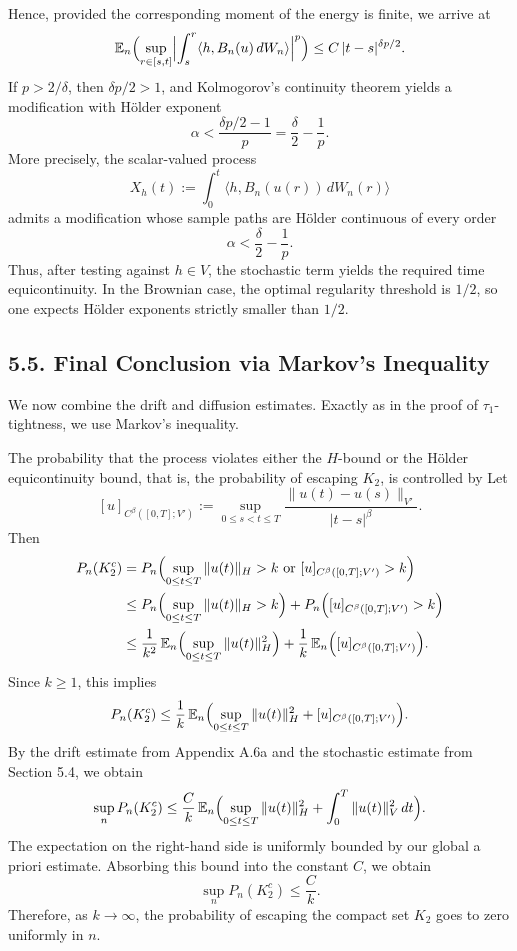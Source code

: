 \documentclass[11pt]{article}
\theoremstyle{definition}
\theoremstyle{remark}
\begin{document}
Hence, provided the corresponding moment of the energy is finite, we arrive at
\[
  \mathbb E_n\Bigl(
    \sup_{r\in[s,t]}
    \Bigl|
      \int_s^r \langle h,B_n(u)\,dW_n\rangle
    \Bigr|^p
  \Bigr)
  \le
  C\,|t-s|^{\delta p/2}.
\]
If $p>2/\delta$, then $\delta p/2>1$, and Kolmogorov's continuity theorem yields a modification with H\"older exponent
\[
  \alpha<\frac{\delta p/2-1}{p}=\frac{\delta}{2}-\frac{1}{p}.
\]
More precisely, the scalar-valued process
\[
  X_h(t):=\int_0^t \langle h,B_n(u(r))\,dW_n(r)\rangle
\]
admits a modification whose sample paths are H\"older continuous of every order
\[
  \alpha<\frac{\delta}{2}-\frac{1}{p}.
\]
Thus, after testing against $h\in V$, the stochastic term yields the required time equicontinuity. In the Brownian case, the optimal regularity threshold is $1/2$, so one expects H\"older exponents strictly smaller than $1/2$.

\subsection*{5.5. Final Conclusion via Markov's Inequality}
We now combine the drift and diffusion estimates. Exactly as in the proof of $\tau_1$-tightness, we use Markov's inequality.

The probability that the process violates either the $H$-bound or the H\"older equicontinuity bound, that is, the probability of escaping $K_2$, is controlled by
Let
\[
  [u]_{C^\beta([0,T];V')}
  :=
  \sup_{0\le s<t\le T}\frac{\|u(t)-u(s)\|_{V'}}{|t-s|^\beta}.
\]
Then
\begin{align*}
  P_n(K_2^c)
  &=
  P_n\Bigl(
    \sup_{0\le t\le T}\|u(t)\|_H>k
    \ \text{or}\
    [u]_{C^\beta([0,T];V')}>k
  \Bigr) \\
  &\le
  P_n\Bigl(
    \sup_{0\le t\le T}\|u(t)\|_H>k
  \Bigr)
  +
  P_n\Bigl(
    [u]_{C^\beta([0,T];V')}>k
  \Bigr) \\
  &\le
  \frac{1}{k^2}\,
  \mathbb E_n\Bigl(
    \sup_{0\le t\le T}\|u(t)\|_H^2
  \Bigr)
  +
  \frac{1}{k}\,
  \mathbb E_n\Bigl(
    [u]_{C^\beta([0,T];V')}
  \Bigr).
\end{align*}
Since $k\ge 1$, this implies
\[
  P_n(K_2^c)
  \le
  \frac{1}{k}\,
  \mathbb E_n\Bigl(
    \sup_{0\le t\le T}\|u(t)\|_H^2
    +
    [u]_{C^\beta([0,T];V')}
  \Bigr).
\]
By the drift estimate from Appendix A.6a and the stochastic estimate from Section 5.4, we obtain
\[
  \sup_n P_n(K_2^c)
  \le
  \frac{C}{k}\,
  \mathbb E_n\Bigl(
    \sup_{0\le t\le T}\|u(t)\|_H^2
    +
    \int_0^T \|u(t)\|_V^2\,dt
  \Bigr).
\]
The expectation on the right-hand side is uniformly bounded by our global a priori estimate. Absorbing this bound into the constant $C$, we obtain
\[
  \sup_n P_n(K_2^c)\le \frac{C}{k}.
\]
Therefore, as $k\to\infty$, the probability of escaping the compact set $K_2$ goes to zero uniformly in $n$.
\end{document}
